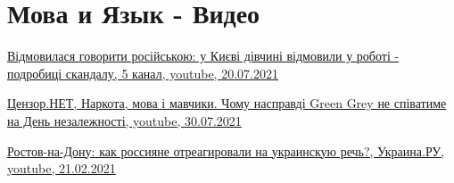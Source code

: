  
 
 
 
 
\section{Мова и Язык - Видео}

\href{https://www.youtube.com/watch?v=swb22_gGNMo}{%
Відмовилася говорити російською: у Києві дівчині відмовили у роботі - подробиці скандалу,%
5 канал, youtube, 20.07.2021%
}

\href{https://www.youtube.com/watch?v=7C4h6jjCyFc}{%
Цензор.НЕТ, Наркота, мова і мавчики. Чому насправді Green Grey не співатиме на День незалежності, youtube, 30.07.2021%
}

\href{https://www.youtube.com/watch?v=gxZeNPXA4cU}{%
Ростов-на-Дону: как россияне отреагировали на украинскую речь?, Украина.РУ, youtube, 21.02.2021%
}
